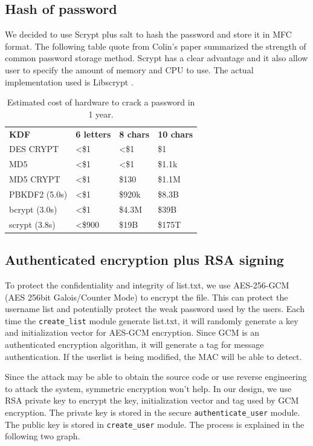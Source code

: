 \documentclass[journal]{IEEEtran}
\begin{document}
\subsection{Hash of password}
We decided to use Scrypt\cite{scrypt} plus salt to hash the password and store it in MFC format\cite{MCF}. The following table quote from Colin's paper\cite{scrypt} summarized the strength of common password storage method. Scrypt has a clear advantage and it also allow user to specify the amount of memory and CPU to use. The actual implementation used is Libscrypt \cite{libscrypt}.
\begin{table}[h]
\centering
\caption{Estimated cost of hardware to crack a password in 1 year.\cite{scrypt}}
\label{my-label}
\begin{tabular}{llll}
\textbf{KDF}  & \textbf{6 letters} & \textbf{8 chars} & \textbf{10 chars} \\
DES CRYPT     & \textless \$1      & \textless \$1    & \$1               \\
MD5           & \textless \$1      & \textless \$1    & \$1.1k            \\
MD5 CRYPT     & \textless \$1      & \$130            & \$1.1M            \\
PBKDF2 (5.0s) & \textless \$1      & \$920k           & \$8.3B            \\
bcrypt (3.0s) & \textless \$1      & \$4.3M           & \$39B             \\
scrypt (3.8s) & \textless \$900    & \$19B            & \$175T           
\end{tabular}
\end{table}

\subsection{Authenticated encryption plus RSA signing}
To protect the confidentiality and integrity of list.txt, we use AES-256-GCM (AES 256bit Galois/Counter Mode) to encrypt the file. This can protect the username list and potentially protect the weak password used by the users. Each time the \texttt{create\_list} module generate list.txt, it will randomly generate a key and initialization vector for AES-GCM encryption. Since GCM is an authenticated encryption algorithm, it will generate a tag for message authentication. If the userlist is being modified, the MAC will be able to detect.

Since the attack may be able to obtain the source code or use reverse engineering to attack the system, symmetric encryption won't help. In our design, we use RSA private key to encrypt the key, initialization vector and tag used by GCM encryption. The private key is stored in the secure \texttt{authenticate\_user} module. The public key is stored in \texttt{create\_user} module. The process is explained in the following two graph.
\end{document}
